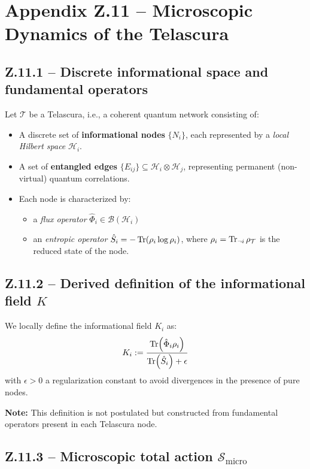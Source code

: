 \documentclass[12pt]{article}
\begin{document}
\section*{Appendix Z.11 – Microscopic Dynamics of the Telascura}

\subsection*{Z.11.1 – Discrete informational space and fundamental operators}

Let \(\mathcal{T}\) be a Telascura, i.e., a coherent quantum network consisting of:
\begin{itemize}
  \item A discrete set of \textbf{informational nodes} \( \{ N_i \} \), each represented by a \textit{local Hilbert space} \(\mathcal{H}_i\).
  \item A set of \textbf{entangled edges} \( \{ E_{ij} \} \subseteq \mathcal{H}_i \otimes \mathcal{H}_j \), representing permanent (non-virtual) quantum correlations.
  \item Each node is characterized by:
  \begin{itemize}
    \item a \textit{flux operator} \( \hat{\Phi}_i \in \mathcal{B}(\mathcal{H}_i) \)
    \item an \textit{entropic operator} \( \hat{S}_i = - \Tr(\rho_i \log \rho_i) \), where \( \rho_i = \Tr_{\neg i} \rho_{\mathcal{T}} \) is the reduced state of the node.
  \end{itemize}
\end{itemize}

\subsection*{Z.11.2 – Derived definition of the informational field \( K \)}

We locally define the informational field \( K_i \) as:
\[
K_i := \frac{\Tr(\hat{\Phi}_i \rho_i)}{\Tr(\hat{S}_i) + \epsilon}
\]
with \( \epsilon > 0 \) a regularization constant to avoid divergences in the presence of pure nodes.

\textbf{Note:} This definition is not postulated but constructed from fundamental operators present in each Telascura node.

\subsection*{Z.11.3 – Microscopic total action \( \mathcal{S}_{\text{micro}} \)}
\end{document}
